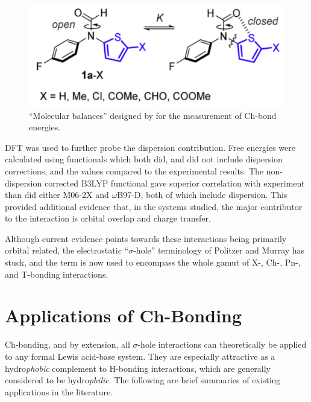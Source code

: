 \begin{refsection}
\begin{figure}
    \centering
    \includegraphics[width=0.6\linewidth]{Figures/cockroft-balances.pdf}
    \caption{``Molecular balances'' designed by \citeauthor{Pascoe2017} for the measurement of Ch-bond energies.\autocite{Pascoe2017}}\label{fig:cockroft-balances}
\end{figure}

DFT was used to further probe the dispersion contribution.
Free energies were calculated using functionals which both did, and did not include dispersion corrections, and the values compared to the experimental results.
The non-dispersion corrected B3LYP functional gave superior correlation with experiment than did either M06-2X and $ \omega $B97-D, both of which include dispersion.
This provided additional evidence that, in the systems studied, the major contributor to the interaction is orbital overlap and charge transfer.

Although current evidence points towards these interactions being primarily orbital related, the electrostatic ``$ \sigma $-hole'' terminology of Politzer and Murray has stuck, and the term is now used to encompass the whole gamut of X-, Ch-, Pn-, and T-bonding interactions.

\section{Applications of Ch-Bonding}
Ch-bonding, and by extension, all $ \sigma $-hole interactions can theoretically be applied to any formal Lewis acid-base system.
They are especially attractive as a hydro\emph{phobic} complement to H-bonding interactions, which are generally considered to be hydro\emph{philic}.
The following are brief summaries of existing applications in the literature.


\end{refsection}
